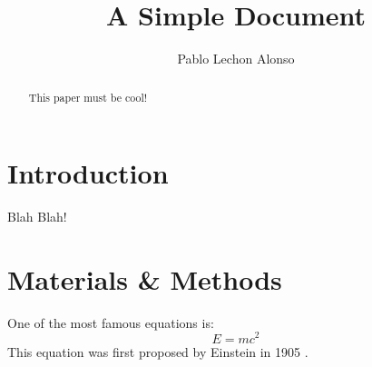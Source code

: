\documentclass[12pt]{article}
\title{A Simple Document}
\author{Pablo Lechon Alonso}
\date{}
\begin{document}
  \maketitle
  
  \begin{abstract}
    This paper must be cool!
  \end{abstract}
  
  \section{Introduction}
    Blah Blah!
  
  \section{Materials \& Methods}
  One of the most famous equations is:
  \begin{equation}
    E = mc^2
  \end{equation}
  This equation was first proposed by Einstein in 1905 
  \cite{einstein1905does}.
  
  
  
\end{document}
